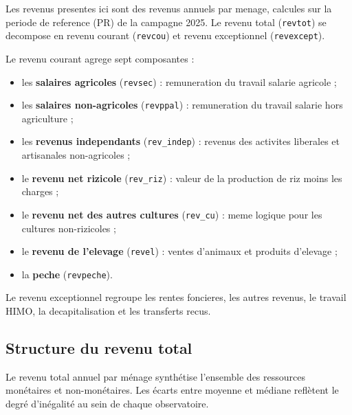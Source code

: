 \documentclass[
  french,
  letterpaper,
]{report}
\providecommand{\tightlist}{%
  \setlength{\itemsep}{0pt}\setlength{\parskip}{0pt}}
\begin{document}
Les revenus presentes ici sont des revenus annuels par menage, calcules
sur la periode de reference (PR) de la campagne 2025. Le revenu total
(\texttt{revtot}) se decompose en revenu courant (\texttt{revcou}) et
revenu exceptionnel (\texttt{revexcept}).

Le revenu courant agrege sept composantes :

\begin{itemize}
\tightlist
\item
  les \textbf{salaires agricoles} (\texttt{revsec}) : remuneration du
  travail salarie agricole ;
\item
  les \textbf{salaires non-agricoles} (\texttt{revppal}) : remuneration
  du travail salarie hors agriculture ;
\item
  les \textbf{revenus independants} (\texttt{rev\_indep}) : revenus des
  activites liberales et artisanales non-agricoles ;
\item
  le \textbf{revenu net rizicole} (\texttt{rev\_riz}) : valeur de la
  production de riz moins les charges ;
\item
  le \textbf{revenu net des autres cultures} (\texttt{rev\_cu}) : meme
  logique pour les cultures non-rizicoles ;
\item
  le \textbf{revenu de l'elevage} (\texttt{revel}) : ventes d'animaux et
  produits d'elevage ;
\item
  la \textbf{peche} (\texttt{revpeche}).
\end{itemize}

Le revenu exceptionnel regroupe les rentes foncieres, les autres
revenus, le travail HIMO, la decapitalisation et les transferts recus.

\subsection{Structure du revenu total}\label{structure-du-revenu-total}

Le revenu total annuel par ménage synthétise l'ensemble des ressources
monétaires et non-monétaires. Les écarts entre moyenne et médiane
reflètent le degré d'inégalité au sein de chaque observatoire.
\end{document}

